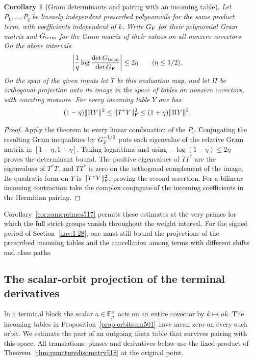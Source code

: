\documentclass[a4paper,11pt]{article}
\newtheorem{corollary}[proposition]{Corollary}
\theoremstyle{definition}
\theoremstyle{remark}
\numberwithin{equation}{section}
\begin{document}
\begin{corollary}[Gram determinants and pairing with an incoming table]
\leavevmode\label{cor:terminalgram518}
Let \(P_1,\ldots,P_q\) be linearly independent prescribed
polynomials for the same product term, with coefficients independent
of \(k\). Write \(G_{\rm F}\) for their polynomial Gram matrix and
\(G_{\rm term}\) for the Gram matrix of their values on all nonzero
covectors. On the above intervals
\[
 \left|\frac{1}{q}\log\frac{\det G_{\rm term}}{\det G_{\rm F}}\right|
 \le 2\eta\qquad(\eta\le1/2).
\]
On the span of the given inputs let \(T\) be this evaluation
map, and let \(\Pi\) be orthogonal projection onto its image in
the space of tables on nonzero covectors, with counting measure.
For every incoming table \(Y\) one has
\[
 (1-\eta)\|\Pi Y\|^2\le\|T^*Y\|_{\rm F}^2
                       \le(1+\eta)\|\Pi Y\|^2.
\]
\end{corollary}
\begin{proof}
Apply the theorem to every linear combination of the \(P_i\).
Conjugating the resulting Gram inequalities by \(G_{\rm F}^{-1/2}\)
puts each eigenvalue of the relative Gram matrix in
\([1-\eta,1+\eta]\). Taking logarithms and using
\(-\log(1-\eta)\le2\eta\) proves the determinant bound. The
positive eigenvalues of \(TT^*\) are the eigenvalues of \(T^*T\),
and \(TT^*\) is zero on the orthogonal complement of the image.
Its quadratic form on \(Y\) is \(\|T^*Y\|_{\rm F}^2\), proving the
second assertion. For a bilinear incoming contraction take the
complex conjugate of the incoming coefficients in the Hermitian pairing.
\end{proof}

Corollary~\ref{cor:sameprimes517} permits these estimates at the very
primes for which the full strict groups vanish throughout the weight
interval. For the signed period of Section~\ref{nav:I-28}, one must
still bound the projections of the prescribed incoming tables and
the cancellation among terms with different shifts and class paths.


\subsection{The scalar-orbit projection of the terminal derivatives}
\label{sec:scalarprojection519}

In a terminal block the scalar \(a\in\mathbb F_p^\times\) acts on
an entire covector by \(k\mapsto ak\). The incoming tables in
Proposition~\ref{prop:orbitsum501} have mean zero on every such
orbit. We estimate the part of an outgoing theta table that
survives pairing with this space. All translations, phases and
derivatives below use the fixed product of
Theorem~\ref{thm:puncturedisometry518} at the original point.
\end{document}
